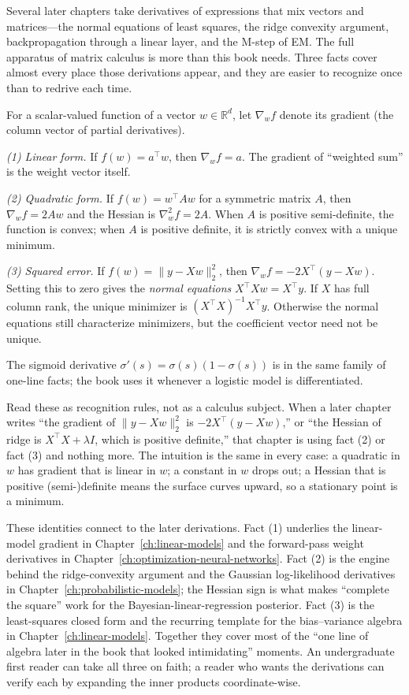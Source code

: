 Several later chapters take derivatives of expressions that mix vectors and matrices---the normal equations of least squares, the ridge convexity argument, backpropagation through a linear layer, and the M-step of EM. The full apparatus of matrix calculus is more than this book needs. Three facts cover almost every place those derivations appear, and they are easier to recognize once than to redrive each time.

For a scalar-valued function of a vector \(w \in \mathbb{R}^d\), let \(\nabla_w f\) denote its gradient (the column vector of partial derivatives).

\emph{(1) Linear form.} If \(f(w) = a^\top w\), then \(\nabla_w f = a\). The gradient of ``weighted sum'' is the weight vector itself.

\emph{(2) Quadratic form.} If \(f(w) = w^\top A w\) for a symmetric matrix \(A\), then \(\nabla_w f = 2 A w\) and the Hessian is \(\nabla_w^2 f = 2A\). When \(A\) is positive semi-definite, the function is convex; when \(A\) is positive definite, it is strictly convex with a unique minimum.

\emph{(3) Squared error.} If \(f(w) = \|y - X w\|_2^2\), then \(\nabla_w f = -2 X^\top (y - X w)\). Setting this to zero gives the \emph{normal equations} \(X^\top X w = X^\top y\). If $X$ has full column rank, the unique minimizer is $(X^\top X)^{-1}X^\top y$. Otherwise the normal equations still characterize minimizers, but the coefficient vector need not be unique.

The sigmoid derivative \(\sigma'(s) = \sigma(s)(1 - \sigma(s))\) is in the same family of one-line facts; the book uses it whenever a logistic model is differentiated.

Read these as recognition rules, not as a calculus subject. When a later chapter writes ``the gradient of \(\|y - Xw\|_2^2\) is \(-2 X^\top (y - Xw)\),'' or ``the Hessian of ridge is \(X^\top X + \lambda I\), which is positive definite,'' that chapter is using fact (2) or fact (3) and nothing more. The intuition is the same in every case: a quadratic in \(w\) has gradient that is linear in \(w\); a constant in \(w\) drops out; a Hessian that is positive (semi-)definite means the surface curves upward, so a stationary point is a minimum.

These identities connect to the later derivations. Fact (1) underlies the linear-model gradient in Chapter~\ref{ch:linear-models} and the forward-pass weight derivatives in Chapter~\ref{ch:optimization-neural-networks}. Fact (2) is the engine behind the ridge-convexity argument and the Gaussian log-likelihood derivatives in Chapter~\ref{ch:probabilistic-models}; the Hessian sign is what makes ``complete the square'' work for the Bayesian-linear-regression posterior. Fact (3) is the least-squares closed form and the recurring template for the bias--variance algebra in Chapter~\ref{ch:linear-models}. Together they cover most of the ``one line of algebra later in the book that looked intimidating'' moments. An undergraduate first reader can take all three on faith; a reader who wants the derivations can verify each by expanding the inner products coordinate-wise.


